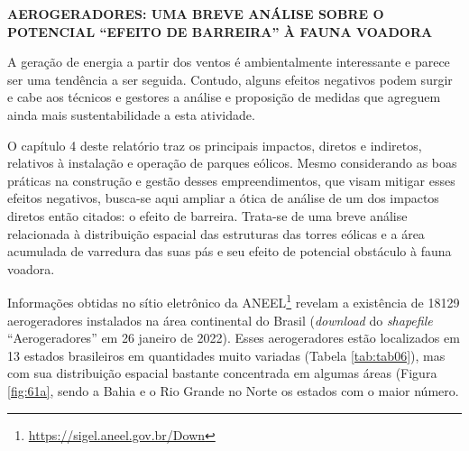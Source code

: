 \documentclass[
  oneside]{scrbook}
\DeclareRobustCommand{\href}[2]{#2\footnote{\url{#1}}}
\begin{document}
\begin{blackbox}

\begin{center}
\textbf{AEROGERADORES: UMA BREVE ANÁLISE SOBRE O POTENCIAL ``EFEITO DE BARREIRA'' À FAUNA VOADORA}

\end{center}

A geração de energia a partir dos ventos é ambientalmente interessante e parece ser uma tendência a ser seguida. Contudo, alguns efeitos negativos podem surgir e cabe aos técnicos e gestores a análise e proposição de medidas que agreguem ainda mais sustentabilidade a esta atividade.

O capítulo 4 deste relatório traz os principais impactos, diretos e indiretos, relativos à instalação e operação de parques eólicos. Mesmo considerando as boas práticas na construção e gestão desses empreendimentos, que visam mitigar esses efeitos negativos, busca-se aqui ampliar a ótica de análise de um dos impactos diretos então citados: o efeito de barreira. Trata-se de uma breve análise relacionada à distribuição espacial das estruturas das torres eólicas e a área acumulada de varredura das suas pás e seu efeito de potencial obstáculo à fauna voadora.

Informações obtidas no \href{https://sigel.aneel.gov.br/Down}{sítio eletrônico da ANEEL} revelam a existência de 18129 aerogeradores instalados na área continental do Brasil (\emph{download} do \emph{shapefile} ``Aerogeradores'' em 26 janeiro de 2022). Esses aerogeradores estão localizados em 13 estados brasileiros em quantidades muito variadas (Tabela \ref{tab:tab06}), mas com sua distribuição espacial bastante concentrada em algumas áreas (Figura \ref{fig:61a}, sendo a Bahia e o Rio Grande no Norte os estados com o maior número.

\end{blackbox}
\end{document}
